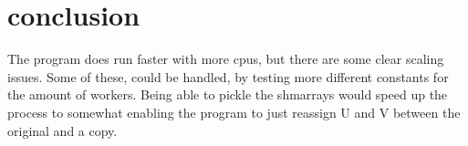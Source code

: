 \documentclass{Article}
\begin{document}
\section{conclusion}
The program does run faster with more cpus, but there are some clear scaling issues. Some of these, could be handled, by testing more different constants for the amount of workers. Being able to pickle the shmarrays would speed up the process to somewhat enabling the program to just reassign U and V between the original and a copy.
\end{document}
